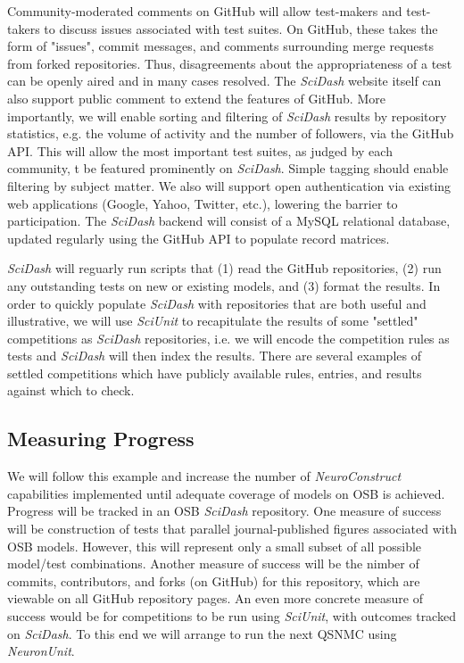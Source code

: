 \documentclass[11pt,letterpaper]{article}
\begin{document}
Community-moderated comments on GitHub will allow test-makers and test-takers to discuss issues associated with test suites.  On GitHub, these takes the form of "issues", commit messages, and comments surrounding merge requests from forked repositories.  Thus, disagreements about the appropriateness of a test can be openly aired and in many cases resolved.  The \textit{SciDash} website itself can also support public comment to extend the features of GitHub.  More importantly, we will enable sorting and filtering of \textit{SciDash} results by repository statistics, e.g. the volume of activity and the number of followers, via the GitHub API.  This will allow the most important test suites, as judged by each community, t be featured prominently on \textit{SciDash}.  Simple tagging should enable filtering by subject matter.  We also will support open authentication via existing web applications (Google, Yahoo, Twitter, etc.), lowering the barrier to participation.  The \textit{SciDash} backend will consist of a MySQL relational database, updated regularly using the GitHub API to populate record matrices.  

\textit{SciDash} will reguarly run scripts that (1) read the GitHub repositories, (2) run any outstanding tests on new or existing models, and (3) format the results.  In order to quickly populate \textit{SciDash} with repositories that are both useful and illustrative, we will use \textit{SciUnit} to recapitulate the results of some "settled" competitions as \textit{SciDash} repositories, i.e. we will encode the competition rules as tests and \textit{SciDash} will then index the results.  There are several examples of settled competitions which have publicly available rules, entries, and results against which to check\cite{jolivet_quantitative_2008}.  

\subsection{Measuring Progress}
We will follow this example and increase the number of \textit{NeuroConstruct} capabilities implemented until adequate coverage of models on OSB is achieved.  Progress will be tracked in an OSB \textit{SciDash} repository.  One measure of success will be construction of tests that parallel journal-published figures associated with OSB models.  However, this will represent only a small subset of all possible model/test combinations.  Another measure of success will be the nimber of commits, contributors, and forks (on GitHub) for this repository, which are viewable on all GitHub repository pages.  An even more concrete measure of success would be for competitions to be run using \textit{SciUnit}, with outcomes tracked on \textit{SciDash}.   To this end we will arrange to run the next QSNMC using \textit{NeuronUnit}.  
\end{document}
